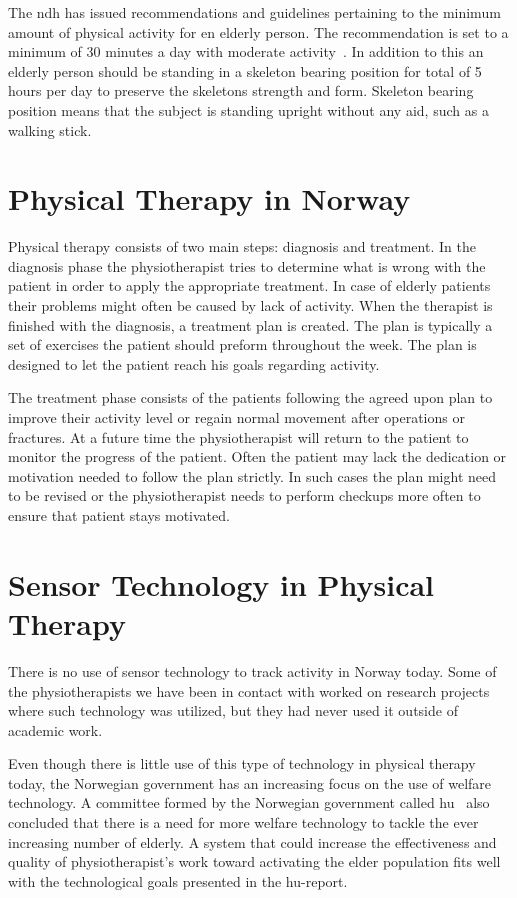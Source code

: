 The \gls{ndh} has issued recommendations and guidelines pertaining to the minimum amount of physical activity for en elderly person. The recommendation is set to a minimum of 30 minutes a day with moderate activity~\cite{helsedirektoratetFysiskAktivitet}. In addition to this an elderly person should be standing in a skeleton bearing position for total of 5 hours per day to preserve the skeletons strength and form. Skeleton bearing position means that the subject is standing upright without any aid, such as a walking stick.

\section{Physical Therapy in Norway}
Physical therapy consists of two main steps: diagnosis and treatment. In the diagnosis phase the physiotherapist tries to determine what is wrong with the patient in order to apply the appropriate treatment. In case of elderly patients their problems might often be caused by lack of activity. When the therapist is finished with the diagnosis, a treatment plan is created. The plan is typically a set of exercises the patient should preform throughout the week. The plan is designed to let the patient reach his goals regarding activity.

The treatment phase consists of the patients following the agreed upon plan to improve their activity level or regain normal movement after operations or fractures. At a future time the physiotherapist will return to the patient to monitor the progress of the patient. Often the patient may lack the dedication or motivation needed to follow the plan strictly. In such cases the plan might need to be revised or the physiotherapist needs to perform checkups more often to ensure that patient stays motivated.

\section{Sensor Technology in Physical Therapy}
There is no use of sensor technology to track activity in Norway today. Some of the physiotherapists we have been in contact with worked on research projects where such technology was utilized, but they had never used it outside of academic work.

Even though there is little use of this type of technology in physical therapy today, the Norwegian government has an increasing focus on the use of welfare technology. A committee formed by the Norwegian government called \gls{hu}~\cite{haagen} also concluded that there is a need for more welfare technology to tackle the ever increasing number of elderly. A system that could increase the effectiveness and quality of physiotherapist's work toward activating the elder population fits well with the technological goals presented in the \gls{hu}-report.  

